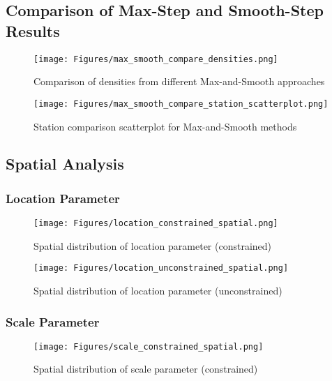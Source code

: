 
\subsection{Comparison of Max-Step and Smooth-Step Results}

\begin{figure}[!htbp]
    \centering
    \texttt{[image: Figures/max\_smooth\_compare\_densities.png]}
    \caption{Comparison of densities from different Max-and-Smooth approaches}
    \label{fig:max_smooth_densities}
\end{figure}

\begin{figure}[!htbp]
    \centering
    \texttt{[image: Figures/max\_smooth\_compare\_station\_scatterplot.png]}
    \caption{Station comparison scatterplot for Max-and-Smooth methods}
    \label{fig:max_smooth_scatterplot}
\end{figure}

\clearpage
\subsection{Spatial Analysis}

\subsubsection{Location Parameter}

\begin{figure}[!htbp]
    \centering
    \texttt{[image: Figures/location\_constrained\_spatial.png]}
    \caption{Spatial distribution of location parameter (constrained)}
    \label{fig:location_constrained}
\end{figure}

\begin{figure}[!htbp]
    \centering
    \texttt{[image: Figures/location\_unconstrained\_spatial.png]}
    \caption{Spatial distribution of location parameter (unconstrained)}
    \label{fig:location_unconstrained}
\end{figure}

\clearpage
\subsubsection{Scale Parameter}

\begin{figure}[!htbp]
    \centering
    \texttt{[image: Figures/scale\_constrained\_spatial.png]}
    \caption{Spatial distribution of scale parameter (constrained)}
    \label{fig:scale_constrained}
\end{figure}

